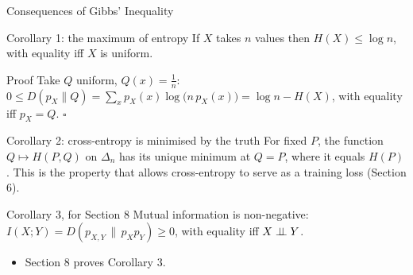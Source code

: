 \begin{frame}{Consequences of Gibbs' Inequality}
  \small
  \begin{block}{Corollary 1: the maximum of entropy}
    If $X$ takes $n$ values then $H(X)\le\log n$, with equality iff $X$ is uniform.
  \end{block}
  \begin{block}{Proof}
    Take $Q$ uniform, $Q(x)=\tfrac1n$: $0\le D(p_X\|Q)=\sum_xp_X(x)\log\big(n\,p_X(x)\big)=\log n-H(X)$, with equality iff $p_X=Q$. \hfill$\square$
  \end{block}
  \begin{block}{Corollary 2: cross-entropy is minimised by the truth}
    For fixed $P$, the function $Q\mapsto H(P,Q)$ on $\Delta_n$ has its unique minimum at $Q=P$, where it equals $H(P)$. This is the property that allows cross-entropy to serve as a training loss (Section 6).
  \end{block}
  \begin{block}{Corollary 3, for Section 8}
    Mutual information is non-negative: $I(X;Y)=D(p_{X,Y}\,\|\,p_Xp_Y)\ge0$, with equality iff $X\perp\!\!\!\perp Y$.
  \end{block}
  \begin{itemize}
    \item Section 8 proves Corollary 3.
  \end{itemize}
\end{frame}

